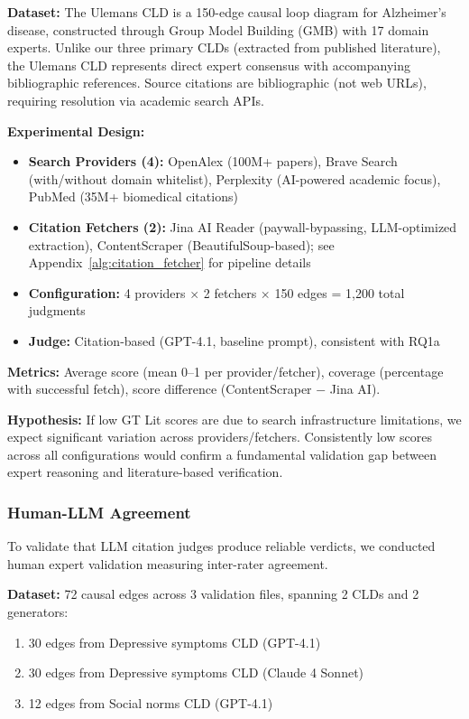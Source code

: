 \textbf{Dataset:} The Ulemans CLD is a 150-edge causal loop diagram for Alzheimer's disease, constructed through Group Model Building (GMB) with 17 domain experts. Unlike our three primary CLDs (extracted from published literature), the Ulemans CLD represents direct expert consensus with accompanying bibliographic references. Source citations are bibliographic (not web URLs), requiring resolution via academic search APIs.

\textbf{Experimental Design:}
\begin{itemize}[noitemsep]
    \item \textbf{Search Providers (4):} OpenAlex (100M+ papers), Brave Search (with/without domain whitelist), Perplexity (AI-powered academic focus), PubMed (35M+ biomedical citations)
    \item \textbf{Citation Fetchers (2):} Jina AI Reader (paywall-bypassing, LLM-optimized extraction), ContentScraper (BeautifulSoup-based); see Appendix~\ref{alg:citation_fetcher} for pipeline details
    \item \textbf{Configuration:} 4 providers $\times$ 2 fetchers $\times$ 150 edges = 1,200 total judgments
    \item \textbf{Judge:} Citation-based (GPT-4.1, baseline prompt), consistent with RQ1a
\end{itemize}

\textbf{Metrics:} Average score (mean 0--1 per provider/fetcher), coverage (percentage with successful fetch), score difference (ContentScraper $-$ Jina AI).

\textbf{Hypothesis:} If low GT Lit scores are due to search infrastructure limitations, we expect significant variation across providers/fetchers. Consistently low scores across all configurations would confirm a fundamental validation gap between expert reasoning and literature-based verification.

\subsubsection{Human-LLM Agreement}
\label{sec:human_llm_agreement}

To validate that LLM citation judges produce reliable verdicts, we conducted human expert validation measuring inter-rater agreement.

\textbf{Dataset:} 72 causal edges across 3 validation files, spanning 2 CLDs and 2 generators:
\begin{enumerate}[noitemsep]
    \item 30 edges from Depressive symptoms CLD (GPT-4.1)
    \item 30 edges from Depressive symptoms CLD (Claude 4 Sonnet)
    \item 12 edges from Social norms CLD (GPT-4.1)
\end{enumerate}

